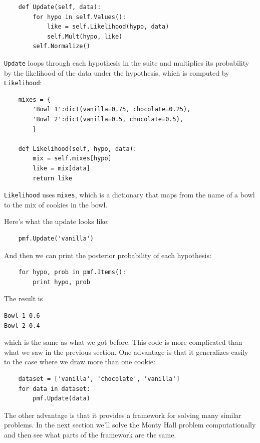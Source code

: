 \documentclass[12pt]{book}
\begin{document}
\begin{verbatim}
    def Update(self, data):
        for hypo in self.Values():
            like = self.Likelihood(hypo, data)
            self.Mult(hypo, like)
        self.Normalize()
\end{verbatim}

\verb"Update" loops through each hypothesis in the suite
and multiplies its probability by the likelihood of the
data under the hypothesis, which is computed by \verb"Likelihood":

\begin{verbatim}
    mixes = {
        'Bowl 1':dict(vanilla=0.75, chocolate=0.25),
        'Bowl 2':dict(vanilla=0.5, chocolate=0.5),
        }

    def Likelihood(self, hypo, data):
        mix = self.mixes[hypo]
        like = mix[data]
        return like
\end{verbatim}

\verb"Likelihood" uses \verb"mixes", which is a dictionary
that maps from the name of a bowl to the mix of cookies in
the bowl.

Here's what the update looks like:

\begin{verbatim}
    pmf.Update('vanilla')
\end{verbatim}

And then we can print the posterior probability of each hypothesis:

\begin{verbatim}
    for hypo, prob in pmf.Items():
        print hypo, prob
\end{verbatim}

The result is

\begin{verbatim}
Bowl 1 0.6
Bowl 2 0.4
\end{verbatim}

which is the same as what we got before.  This code is more complicated
than what we saw in the previous section.  One advantage is that it
generalizes easily to the case where we draw more than one cookie:

\begin{verbatim}
    dataset = ['vanilla', 'chocolate', 'vanilla']
    for data in dataset:
        pmf.Update(data)
\end{verbatim}

The other advantage is that it provides a framework for solving many
similar problems.  In the next section we'll solve the Monty Hall
problem computationally and then see what parts of the framework are
the same.
\end{document}
